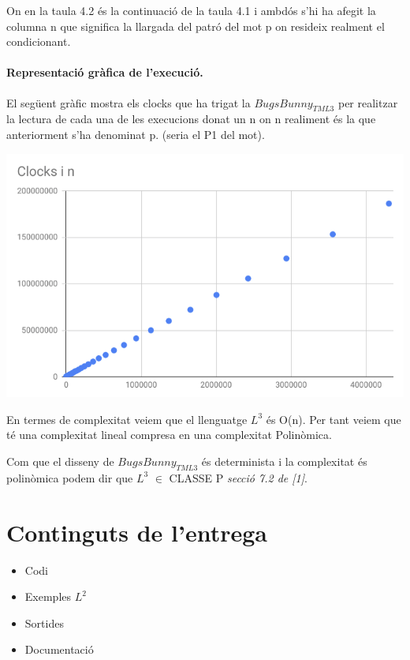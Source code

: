 \documentclass[12pt,a4paper]{report}
\def \tml3{$BugsBunny_{TML3} $}
\begin{document}
On en la taula 4.2 és la continuació de la taula 4.1 i ambdós s'hi ha afegit la columna n que significa la llargada del patró del mot p on resideix realment el condicionant.

\clearpage

\subsubsection{Representació gràfica de l'execució.}

El següent gràfic mostra els clocks que ha trigat la \tml3 per realitzar la lectura de cada una de les execucions donat un n on n realiment és la que anteriorment s'ha denominat p. (seria el P1 del mot).

\begin{center}
\includegraphics[width=16cm]{complextm}
\end{center}

En termes de complexitat veiem que el llenguatge $L^3$  és O(n). Per tant veiem que té una complexitat lineal compresa en una complexitat Polinòmica.

Com que el disseny de \tml3{} és determinista i la complexitat és polinòmica podem dir que $L^3$ $\in$ CLASSE P \textit{secció 7.2 de [1]}.


\clearpage

\chapter{Continguts de l'entrega}

\begin{itemize}
\item Codi
\item Exemples $L^2$
\item Sortides
\item Documentació
\end{itemize}
\end{document}
